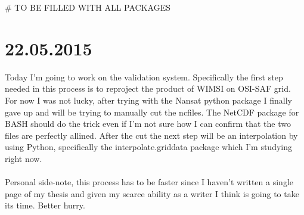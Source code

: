 # TO BE FILLED WITH ALL PACKAGES

\section{22.05.2015}
Today I'm going to work on the validation system. Specifically the first step needed in this process is to reproject the product of WIMSI on OSI-SAF grid. \\
For now I was not lucky, after trying with the Nansat python package I finally gave up and will be trying to manually cut the ncfiles. The NetCDF package for BASH
should do the trick even if I'm not sure how I can confirm that the two files are perfectly allined. After the cut the next step will be an interpolation by using
Python, specifically the interpolate.griddata package which I'm studying right now. \\ \\
Personal side-note, this process has to be faster since I haven't written a single page of my thesis and given my scarce ability as a writer I think is going to take
its time. Better hurry.
